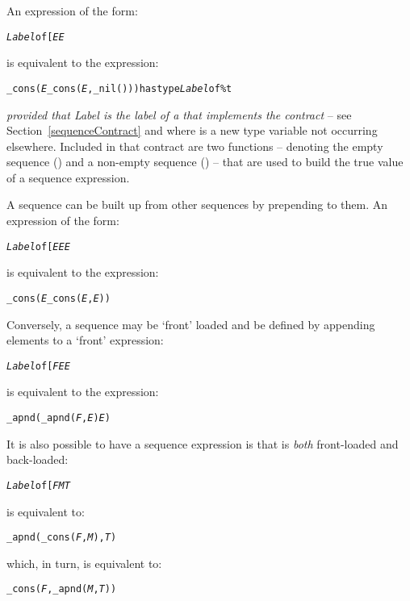An expression of the form:
\begin{alltt}
\emph{Label} of [\emph{E}\sequence{,}\emph{E\subn}\q{]}
\end{alltt}
is equivalent to the expression:
\begin{alltt}
\_cons(\emph{E}\sequence{,}\_cons(\emph{E\subn},\_nil())\sequence{}) has type \emph{Label} of \%t
\end{alltt}
\emph{provided that \emph{Label} is the label of a  that implements the   contract} -- see Section~\vref{sequenceContract} and where  is a new type variable not occurring elsewhere. Included in that contract are two functions -- denoting the empty sequence () and a non-empty sequence () -- that are used to build the true value of a sequence expression.

A sequence can be built up from other sequences by prepending to them. An expression of the form:
\begin{alltt}
\emph{Label} of [\emph{E}\sequence{,}\emph{E}\emph{E\subn}\q{]}
\end{alltt}
is equivalent to the expression:
\begin{alltt}
\_cons(\emph{E}\sequence{,}\_cons(\emph{E},\emph{E\subn})\sequence{})
\end{alltt}

Conversely, a sequence may be `front' loaded and be defined by appending elements to a `front' expression:
\begin{alltt}
\emph{Label} of [\emph{F}\emph{E}\sequence{,}\emph{E\subn}\q{]}
\end{alltt}
is equivalent to the expression:
\begin{alltt}
\_apnd(\sequence{}\_apnd(\emph{F},\emph{E})\sequence{}\emph{E\subn})
\end{alltt}

\begin{aside}
It is also possible to have a sequence expression is that is \emph{both} front-loaded and back-loaded:
\begin{alltt}
\emph{Label} of [\emph{F}\emph{M}\emph{T}\q{]}
\end{alltt}
is equivalent to:
\begin{alltt}
\_apnd(\_cons(\emph{F},\emph{M}),\emph{T})
\end{alltt}
which, in turn, is equivalent to:
\begin{alltt}
\_cons(\emph{F},\_apnd(\emph{M},\emph{T}))
\end{alltt}
\end{aside}

